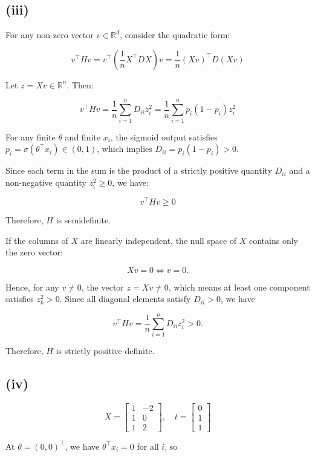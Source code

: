 \documentclass[11pt]{article}
\begin{document}
\subsection*{(iii)}

For any non-zero vector $v \in \mathbb{R}^d$, consider the quadratic form:

$$
v^\top H v = v^\top \left( \frac{1}{n} X^\top D X \right) v = \frac{1}{n} (Xv)^\top D (Xv)
$$

Let $z = Xv \in \mathbb{R}^n$. Then:

$$
v^\top H v = \frac{1}{n} \sum_{i=1}^n D_{ii} z_i^2 = \frac{1}{n} \sum_{i=1}^n p_i(1 - p_i) z_i^2
$$

For any finite $\theta$ and finite $x_i$, the sigmoid output satisfies $p_i = \sigma(\theta^\top x_i) \in (0, 1)$, which implies $D_{ii} = p_i(1 - p_i) > 0$.

Since each term in the sum is the product of a strictly positive quantity $D_{ii}$ and a non-negative quantity $z_i^2 \ge 0$, we have:

$$
v^\top H v \ge 0 
$$

Therefore, $H$ is semidefinite.

If the columns of $X$ are linearly independent, the null space of $X$ contains only the zero vector:

$$
Xv = 0 \iff v = 0.
$$

Hence, for any $v \neq 0$, the vector $z = Xv \neq 0$, which means at least one component satisfies $z_k^2 > 0$. Since all diagonal elements satisfy $D_{ii} > 0$, we have

$$
v^\top H v = \frac{1}{n} \sum_{i=1}^n D_{ii} z_i^2 > 0.
$$

Therefore, $H$ is strictly positive definite.

\subsection*{(iv)}

$$
X = \begin{bmatrix} 1 & -2 \\ 1 & 0 \\ 1 & 2 \end{bmatrix}
,\quad
t = \begin{bmatrix} 0 \\ 1 \\ 1 \end{bmatrix}
$$

At $\theta = (0, 0)^\top$, we have $\theta^\top x_i = 0$ for all $i$, so
\end{document}
